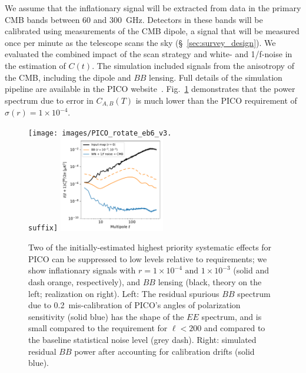 \documentclass[PICOReport.tex]{subfiles}
\begin{document}
We assume that the inflationary signal will be extracted from data in the primary CMB bands between 60 and 300~GHz.  Detectors in these bands will be calibrated using measurements of the CMB dipole, a signal that will be measured once per minute as the telescope scans the sky (\S~\ref{sec:survey_design}).  We evaluated the combined impact of the scan strategy and white- and 1/f-noise in the estimation of $C(t)$.
The simulation included signals from the anisotropy of the CMB, including the dipole and $BB$ lensing. Full details of the simulation pipeline are available in the PICO website~\citep{picoweb_dipole}. Fig.~\ref{fig:rot_bb_tb_eb} demonstrates that the power spectrum due to error in $C_{A,B} (T)$ is much lower than the PICO requirement of $\sigma(r) = 1\times 10^{-4}$. 
\begin{figure}[thb]
\centerline{
\texttt{[image: images/PICO\_rotate\_eb6\_v3.\\suffix]} 
\hspace{0.3in}
\includegraphics[width=0.41\textwidth]{images/calibration_spectrum_BB.pdf} }
\vspace{-0.1in}
\caption{\captiontext
Two of the initially-estimated highest priority systematic effects for PICO can be suppressed to low levels relative to requirements; we show inflationary signals with  $r = 1\times 10^{-4}\,\, \mbox{and} \,\, 1\times 10^{-3}$ (solid and dash orange, respectively), and $BB$ lensing (black, theory on the left; realization on right). Left: The residual spurious $BB$ spectrum due to 0.2\arcmin\ mis-calibration of PICO's angles of polarization sensitivity (solid blue) has the shape of the $EE$ spectrum, and is small compared to the requirement for $\ell<200$ and compared to the baseline statistical noise level (grey dash). Right: simulated residual $BB$ power after accounting for calibration drifts (solid blue). 
\label{fig:rot_bb_tb_eb} }
\vspace{-0.1in}
\end{figure}
\end{document}
